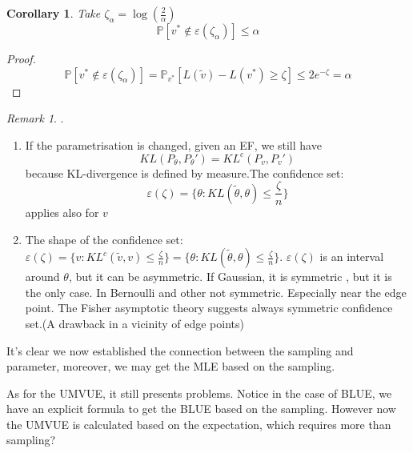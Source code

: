 \documentclass[a4paper,12pt, oneside, fleqn]{book}
\newtheorem{corollary}{Corollary}[theorem]
\theoremstyle{definition}
\theoremstyle{remark}
\newtheorem*{remark}{Remark}
\begin{document}
\begin{corollary}
	Take $\zeta_\alpha = \log (\frac{2}{\alpha})$
	\begin{equation*}
		\mathbb{P}[ v^* \notin \varepsilon(\zeta_\alpha)] \leq \alpha
	\end{equation*}
\end{corollary}

\begin{proof}
	\begin{equation*}
		\mathbb{P}[ v^* \notin \varepsilon(\zeta_\alpha)] = \mathbb{P}_{v^*} [L(\tilde{v}) - L(v^*) \geq \zeta] \leq 2 e^{-\zeta} = \alpha
	\end{equation*}
\end{proof}

\begin{remark}.
\begin{enumerate}
	\item If the parametrisation is changed, given an EF, we still have
		\begin{equation*}
				KL(P_\theta, P_\theta') = KL^c(P_v, P_v')
		\end{equation*}
		because KL-divergence is defined by measure.The confidence set:
		\begin{equation*}
			\varepsilon(\zeta) = \{\theta : KL(\tilde{\theta}, \theta ) \leq \frac{\zeta}{n} \}
		\end{equation*}
		applies also for $v$
	\item The shape of the confidence set:$\varepsilon(\zeta) = \{v : KL^c(\tilde{v}, v) \leq \frac{\zeta}{n} \} = \{\theta : KL(\tilde{\theta}, \theta ) \leq \frac{\zeta}{n} \}$. $\varepsilon(\zeta)$ is an interval around $\theta$, but it can be asymmetric.
If Gaussian, it is symmetric , but it is the only case. In Bernoulli and other not symmetric. Especially near the edge point. The Fisher asymptotic theory suggests always symmetric confidence set.(A drawback in a vicinity of edge points)
\end{enumerate}	
\end{remark}
\newpage






It's clear we now established the connection between the sampling and parameter, moreover, we may get the MLE based on the sampling. \par 
As for the UMVUE, it still presents problems. Notice in the case of BLUE, we have an explicit formula to get the BLUE based on the sampling. However now the UMVUE is calculated based on the expectation, which requires more than sampling?\par 
\end{document}
